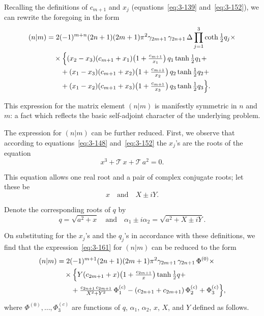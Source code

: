 Recalling the definitions of $c_{m+1}$ and $x_j$ (equations~\eqref{eq:3-139} and~\eqref{eq:3-152}), we can rewrite the foregoing in the form
\begin{align}
(n|m) &= 2(-1)^{m+n}(2n+1)(2m+1)\pi^2\gamma_{2m+1}\,\gamma_{2n+1}\,\Delta\prod_{j=1}^{3}\coth\tfrac{1}{2}q_j\times \notag\\
&\quad\times\Bigl\{(x_2 - x_3)(c_{m+1} + x_1)\bigl(1+\tfrac{c_{m+1}}{x_1}\bigr)\,q_1\tanh\tfrac{1}{2}q_1 + \notag\\
&\qquad + (x_1 - x_3)(c_{m+1} + x_2)\bigl(1+\tfrac{c_{m+1}}{x_2}\bigr)\,q_2\tanh\tfrac{1}{2}q_2 + \notag\\
&\qquad + (x_1 - x_2)(c_{m+1} + x_3)\bigl(1+\tfrac{c_{m+1}}{x_3}\bigr)\,q_3\tanh\tfrac{1}{2}q_3\Bigr\}. \label{eq:3-161}
\end{align}

This expression for the matrix element $(n|m)$ is manifestly symmetric in $n$ and $m$: a fact which reflects the basic self-adjoint character of the underlying problem.

The expression for $(n|m)$ can be further reduced. First, we observe that according to equations~\eqref{eq:3-148} and~\eqref{eq:3-152} the $x_j$'s are the roots of the equation
\begin{equation}\label{eq:3-162}
x^3 + \mathscr{T}\,x + \mathscr{T}\,a^2 = 0.
\end{equation}

This equation allows one real root and a pair of complex conjugate roots; let these be
\begin{equation}\label{eq:3-163}
x \quad \text{and} \quad X \pm iY.
\end{equation}

Denote the corresponding roots of $q$ by
\begin{equation}\label{eq:3-164}
q = \sqrt{a^2 + x} \quad \text{and} \quad \alpha_1 \pm i\alpha_2 = \sqrt{a^2 + X \pm iY}.
\end{equation}

On substituting for the $x_j$'s and the $q_j$'s in accordance with these definitions, we find that the expression~\eqref{eq:3-161} for $(n|m)$ can be reduced to the form
\begin{align}
(n|m) &= 2(-1)^{m+1}(2n+1)(2m+1)\pi^2\gamma_{2m+1}\,\gamma_{2n+1}\,\Phi^{(0)}\times \notag\\
&\quad\times\Bigl\{Y(c_{2m+1}+x)\bigl(1+\tfrac{c_{2m+1}}{x}\bigr)\tanh\tfrac{1}{2}q + \notag\\
&\qquad + \tfrac{c_{2n+1}\,c_{2m+1}}{X^2+Y^2}\,\Phi_1^{(c)} - (c_{2n+1}+c_{2m+1})\,\Phi_2^{(c)} + \Phi_3^{(c)}\Bigr\}, \label{eq:3-165}
\end{align}
where $\Phi^{(0)}, \ldots, \Phi_3^{(c)}$ are functions of $q$, $\alpha_1$, $\alpha_2$, $x$, $X$, and $Y$ defined as follows.

